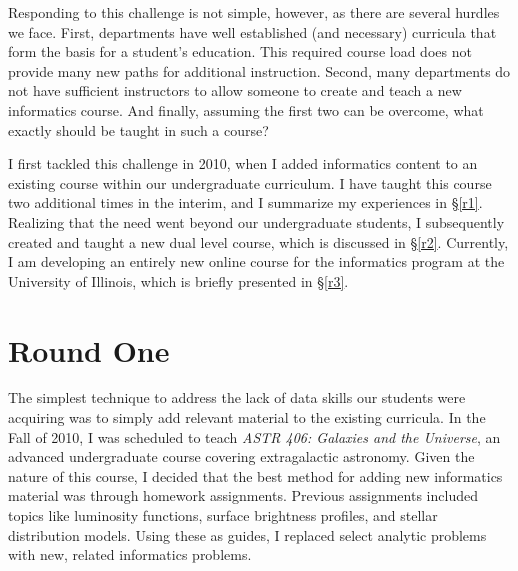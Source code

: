 Responding to this challenge is not simple, however, as there are several hurdles we face. First, departments have well established (and necessary) curricula that form the basis for a student's education. This required course load does not provide many new paths for additional instruction. Second, many departments do not have sufficient instructors to allow someone to create and teach a new informatics course. And finally, assuming the first two can be overcome, what exactly should be taught in such a course?

I first tackled this challenge in 2010, when I added informatics content to an existing course within our undergraduate curriculum. I have taught this course two additional times in the interim, and I summarize my experiences in \S\ref{r1}. Realizing that the need went beyond our undergraduate students, I subsequently created and taught a new dual level course, which is discussed in \S\ref{r2}. Currently, I am developing an entirely new online course for the informatics program at the University of Illinois, which is briefly presented in \S\ref{r3}.

\section{Round One~\label{r1}}

The simplest technique to address the lack of data skills our students were acquiring was to simply add relevant material to the existing curricula. In the Fall of 2010,  I was scheduled to teach \textit{ASTR 406: Galaxies and the Universe}, an advanced undergraduate course covering extragalactic astronomy. Given the nature of this course, I decided that the best method for adding new informatics material was through homework assignments. Previous assignments included topics like luminosity functions, surface brightness profiles, and stellar distribution models. Using these as guides, I replaced select analytic problems with new, related informatics problems.


